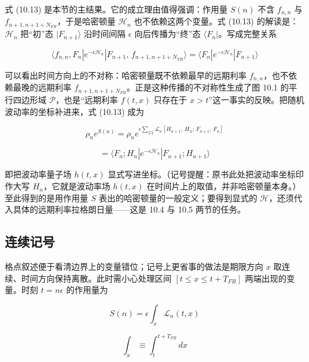 式 (10.13) 是本节的主结果。它的成立理由值得强调：作用量 $S(n)$ 不含 $f_{n,n}$ 与 $f_{n+1,n+1+N_{FR}}$，于是哈密顿量 $\mathcal{H}_n$ 也不依赖这两个变量。式 (10.13) 的解读是：$\mathcal{H}_n$ 把“初”态 $|F_{n+1}\rangle$ 沿时间间隔 $\epsilon$ 向后传播为“终”态 $\langle F_n|$。写成完整关系

\begin{equation*}
\langle f_{n,n},F_n|e^{-\epsilon\mathcal{H}_n}|F_{n+1},\,f_{n+1,n+1+N_{FR}}\rangle
=\langle F_n|e^{-\epsilon\mathcal{H}_n}|F_{n+1}\rangle
\tag{10.14}
\end{equation*}

可以看出时间方向上的不对称：哈密顿量既不依赖最早的远期利率 $f_{n,n}$，也不依赖最晚的远期利率 $f_{n+1,n+1+N_{FR}}$。正是这种传播的不对称性生成了图 10.1 的平行四边形域 $\mathcal{P}$，也是“远期利率 $f(t,x)$ 只存在于 $x>t$”这一事实的反映。把随机波动率的坐标补进来，式 (10.13) 成为

\begin{equation*}
\rho_n e^{S(n)}=\rho_n e^{\epsilon\sum_{\{l\}}\mathcal{L}_n[H_{n+1},\,H_n;\,F_{n+1},\,F_n]}
\tag{10.15}
\end{equation*}

\begin{equation*}
=\langle F_n;H_n|e^{-\epsilon\mathcal{H}_n}|F_{n+1};H_{n+1}\rangle
\tag{10.16}
\end{equation*}

即把波动率量子场 $h(t,x)$ 显式写进坐标。（记号提醒：原书此处把波动率坐标印作大写 $H_n$，它就是波动率场 $h(t,x)$ 在时间片上的取值，并非哈密顿量本身。）至此得到的是用作用量 $S$ 表出的哈密顿量的一般定义；要得到显式的 $\mathcal{H}$，还须代入具体的远期利率拉格朗日量——这是 10.4 与 10.5 两节的任务。

\subsection{连续记号}

格点叙述便于看清边界上的变量错位；记号上更省事的做法是期限方向 $x$ 取连续、时间方向保持离散。此时需小心处理区间 $[t\le x\le t+T_{FR}]$ 两端出现的变量。时刻 $t=n\epsilon$ 的作用量为

\begin{equation*}
S(n)=\epsilon\int_x\mathcal{L}_n(t,x)
\tag{10.17}
\end{equation*}

\begin{equation*}
\int_x\equiv\int_t^{t+T_{FR}}dx
\tag{10.18}
\end{equation*}

